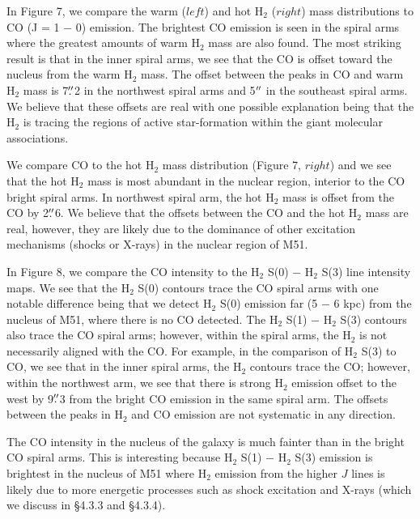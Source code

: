 \documentclass[manuscript]{aastex}
\begin{document}
In Figure 7, we compare the warm ($left$) and hot $\mathrm{H_2}$ ($right$) mass distributions to CO (J = 1 $-$ 0) emission.  The brightest CO emission is seen in the spiral arms where the greatest amounts of warm $\mathrm{H_2}$ mass are also found.  The most striking result is that in the inner spiral arms, we see that the CO is offset toward the nucleus from the warm $\mathrm{H_2}$ mass.  The offset between the peaks in CO and warm $\mathrm{H_2}$ mass is 7$\mbox{$.\!\!^{\prime\prime}$}$2 in the northwest spiral arms and 5$\mbox{$^{\prime\prime}$}$ in the southeast spiral arms.  We believe that these offsets are real with one possible explanation being that the $\mathrm{H_2}$ is tracing the regions of active star-formation within the giant molecular associations.

We compare CO to the hot $\mathrm{H_2}$ mass distribution (Figure 7, $right$) and we see that the hot $\mathrm{H_2}$ mass is most abundant in the nuclear region, interior to the CO bright spiral arms.  In northwest spiral arm, the hot $\mathrm{H_2}$ mass is offset from the CO by 2$\mbox{$.\!\!^{\prime\prime}$}$6. We believe that the offsets between the CO  and the hot $\mathrm{H_2}$ mass are real, however, they are likely due to the dominance of other excitation mechanisms (shocks or X-rays) in the nuclear region of M51.

In Figure 8, we compare the CO intensity to the $\mathrm{H_2}$ S(0) $-$ $\mathrm{H_2}$ S(3) line intensity maps.  We see that the $\mathrm{H_2}$ S(0) contours trace the CO spiral arms with one notable difference being that we detect $\mathrm{H_2}$ S(0) emission far (5 $-$ 6 kpc) from the nucleus of M51, where there is no CO detected.  The $\mathrm{H_2}$ S(1) $-$ $\mathrm{H_2}$ S(3) contours also trace the CO spiral arms; however, within the spiral arms, the $\mathrm{H_2}$ is not necessarily aligned with the CO.  For example, in the comparison of $\mathrm{H_2}$ S(3) to CO, we see that in the inner spiral arms, the $\mathrm{H_2}$ contours trace the CO; however, within the northwest arm, we see that there is strong $\mathrm{H_2}$ emission offset to the west by 9$\mbox{$.\!\!^{\prime\prime}$}$3 from the bright CO emission in the same spiral arm.  The offsets between the peaks in $\mathrm{H_2}$ and CO emission are not systematic in any direction.

The CO intensity in the nucleus of the galaxy is much fainter than in the bright CO spiral arms.  This is interesting because $\mathrm{H_2}$ S(1) $-$ $\mathrm{H_2}$ S(3) emission is brightest in the nucleus of M51 where $\mathrm{H_2}$ emission from the higher $J$ lines is likely due to more energetic processes such as shock excitation and X-rays (which we discuss in \S4.3.3 and \S 4.3.4).
\end{document}
